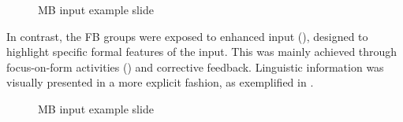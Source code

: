 \begin{figure}[p]
    \caption{MB input example slide}
    \label{fig:02:1}
\end{figure}

In contrast, the FB groups were exposed to enhanced input (\citealt{Sharwood-Smith1993}), designed to highlight specific formal features of the input. This was mainly achieved through focus-on-form activities (\citealt{DoughtyWilliams1998}) and corrective feedback. Linguistic information was visually presented in a more explicit fashion, as exemplified in .

\begin{figure}[p]
    \caption{MB input example slide}
    \label{fig:02:2}
\end{figure}

